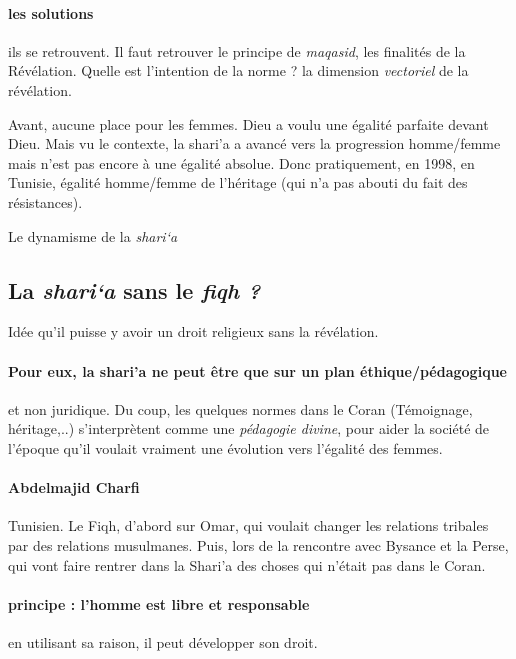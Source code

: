   \paragraph{les solutions} ils se retrouvent. Il faut retrouver le principe de \emph{maqasid}, les finalités de la Révélation. Quelle est l'intention de la norme ? la dimension \textit{vectoriel } de la révélation.
  \begin{Ex}
    Avant, aucune place pour les femmes. Dieu a voulu une égalité parfaite devant Dieu. Mais vu le contexte, la shari'a a avancé vers la progression homme/femme mais n'est pas encore à une égalité absolue.
    Donc pratiquement, en 1998, en Tunisie, égalité homme/femme de l'héritage (qui n'a pas abouti du fait des résistances).
  \end{Ex}
    Le dynamisme de la \emph{shari`a}
    
  
    \subsection{La \emph{shari`a} sans le \emph{fiqh ?}}
    
    Idée qu'il puisse y avoir un droit religieux sans la révélation. 
    \paragraph{Pour eux, la shari'a ne peut être que sur un plan éthique/pédagogique} et non juridique.  Du coup, les quelques normes dans le Coran (Témoignage, héritage,..) s'interprètent comme une \textit{pédagogie divine}, pour aider la société de l'époque qu'il voulait vraiment une évolution vers l'égalité des femmes. 
    
    \paragraph{Abdelmajid Charfi} Tunisien. Le Fiqh, d'abord sur Omar, qui voulait changer les relations tribales par des relations musulmanes. Puis, lors de la rencontre avec Bysance et la Perse, qui vont faire rentrer dans la Shari'a des choses qui n'était pas dans le Coran.
    
    \paragraph{principe : l'homme est libre et responsable} en utilisant sa raison, il peut développer son droit. 
    
